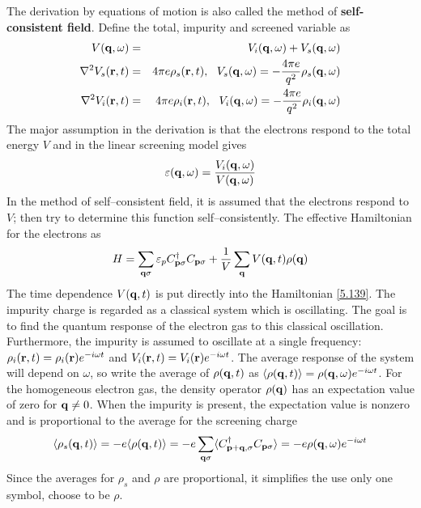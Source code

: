 The derivation by equations of motion is also called the method of \textbf{self-consistent field}.
Define the total, impurity and screened variable as
\begin{eqnarray}
    V(\mathbf{q},\omega) &=& V_i(\mathbf{q},\omega) + V_s(\mathbf{q},\omega) \label{5.135} \\
    \nabla^2 V_s(\mathbf{r},t) &=& 4\pi e\rho_s(\mathbf{r},t),~ ~ V_s(\mathbf{q},\omega) = - \frac{4\pi e}{q^2} \rho_s(\mathbf{q},\omega)   \label{5.136} \\
    \nabla^2 V_i(\mathbf{r},t) &=& 4\pi e\rho_i(\mathbf{r},t),~ ~ V_i(\mathbf{q},\omega) = - \frac{4\pi e}{q^2} \rho_i(\mathbf{q},\omega)   \label{5.137}
\end{eqnarray}
The major assumption in the derivation is that the electrons respond to the total energy $V$ and in the linear screening model gives
\begin{equation}
    \varepsilon(\mathbf{q},\omega) = \frac{V_i(\mathbf{q},\omega)}{V(\mathbf{q},\omega)}  \label{5.138}
\end{equation}
In the method of self--consistent field, it is assumed that the electrons respond to $V$; then try to determine this function self--consistently.
The effective Hamiltonian for the electrons as
\begin{equation}
    H = \sum_{\mathbf{q}\sigma} \varepsilon_p C^\dagger_{\mathbf{p}\sigma} C_{\mathbf{p}\sigma} + \frac{1}{V} \sum_{\mathbf{q}} V(\mathbf{q},t) \rho(\mathbf{q})    \label{5.139}
\end{equation}
The time dependence $V(\mathbf{q},t)$ is put directly into the Hamiltonian \eqref{5.139}.
The impurity charge is regarded as a classical system which is oscillating.
The goal is to find the quantum response of the electron gas to this classical oscillation.
Furthermore, the impurity is assumed to oscillate at a single frequency: $\rho_i(\mathbf{r},t) = \rho_i(\mathbf{r}) e^{-i\omega t}$ and $V_i(\mathbf{r},t) = V_i(\mathbf{r}) e^{-i\omega t}$.
The average response of the system will depend on $\omega$, so write the average of $\rho(\mathbf{q},t)$ as $\langle \rho(\mathbf{q},t) \rangle = \rho(\mathbf{q},\omega) e^{-i\omega t}$.
For the homogeneous electron gas, the density operator $\rho(\mathbf{q})$ has an expectation value of zero for $\mathbf{q}\neq 0$.
When the impurity is present, the expectation value is nonzero and is proportional to the average for the screening charge
\begin{equation}
    \langle \rho_s (\mathbf{q},t) \rangle = - e\langle \rho(\mathbf{q},t)\rangle = - e \sum_{\mathbf{q}\sigma} \langle C^\dagger_{\mathbf{p}+\mathbf{q},\sigma} C_{\mathbf{p} \sigma} \rangle = -e \rho(\mathbf{q},\omega)e^{-i \omega t}    \label{5.140}
\end{equation}
Since the averages for $\rho_s$ and $\rho$ are proportional, it simplifies the use only one symbol, choose to be $\rho$.
